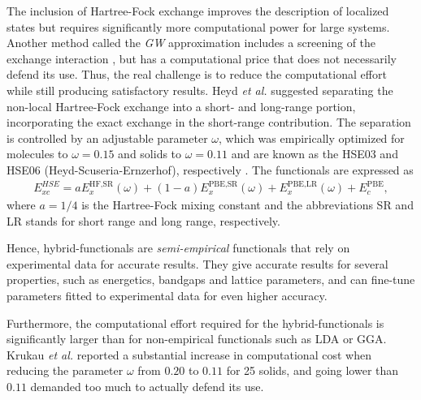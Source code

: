 The inclusion of Hartree-Fock exchange improves the description of localized states but requires significantly more computational power for large systems. Another method called the \textit{GW} approximation includes a screening of the exchange interaction \cite{Aryasetiawan1998}, but has a computational price that does not necessarily defend its use. Thus, the real challenge is to reduce the computational effort while still producing satisfactory results. Heyd \textit{et al.} \cite{Heyd2003} suggested separating the non-local Hartree-Fock exchange into a short- and long-range portion, incorporating the exact exchange in the short-range contribution. The separation is controlled by an adjustable parameter $\omega$, which was empirically optimized for molecules to $\omega = 0.15$ and solids to $\omega = 0.11$ and are known as the HSE03 and HSE06 (Heyd-Scuseria-Ernzerhof), respectively \cite{Krukau2006}. The functionals are expressed as
\begin{align}
  E_{xc}^{HSE} = aE_{x}^{\text{HF,SR}}(\omega) + (1-a)E_x^{\text{PBE,SR}}(\omega) + E_x^{\text{PBE,LR}}(\omega) + E_c^{\text{PBE}},
\end{align}
where $a=1/4$ is the Hartree-Fock mixing constant and the abbreviations SR and LR stands for short range and long range, respectively.

Hence, hybrid-functionals are \textit{semi-empirical} functionals that rely on experimental data for accurate results. They give accurate results for several properties, such as energetics, bandgaps and lattice parameters, and can fine-tune parameters fitted to experimental data for even higher accuracy.

Furthermore, the computational effort required for the hybrid-functionals is significantly larger than for non-empirical functionals such as LDA or GGA. Krukau \textit{et al.} \cite{Krukau2006} reported a substantial increase in computational cost when reducing the parameter $\omega$ from $0.20$ to $0.11$ for 25 solids, and going lower than $0.11$ demanded too much to actually defend its use.

